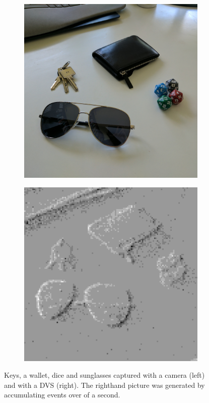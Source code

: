 \begin{figure}[h]
  \centering
  \begin{subfigure}{0.4\textwidth}
    \includegraphics[width=\textwidth]{figures/introduction/objects-camera}
  \end{subfigure}
  \hspace{2em}
  \begin{subfigure}{0.4\textwidth}
    \includegraphics[width=\textwidth]{figures/introduction/objects-dvs}
  \end{subfigure}
  \caption{Keys, a wallet, dice and sunglasses captured with a camera (left) and
    with a DVS (right). The righthand picture was generated by accumulating
    events over  of a second.}
  \label{fig:intro:objects}
\end{figure}


